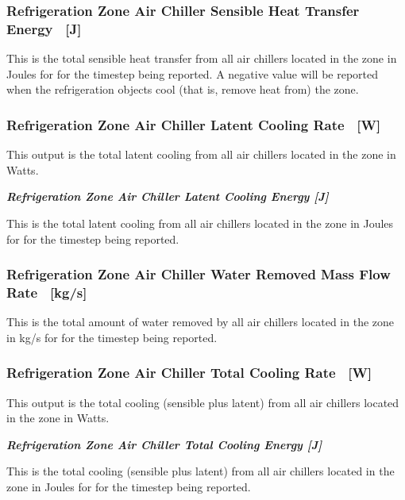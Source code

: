 \subsubsection{Refrigeration Zone Air Chiller Sensible Heat Transfer Energy ~{[}J{]}}\label{refrigeration-zone-air-chiller-sensible-heat-transfer-energy-j}

This is the total sensible heat transfer from all air chillers located in the zone in Joules for for the timestep being reported. A negative value will be reported when the refrigeration objects cool (that is, remove heat from) the zone.

\subsubsection{Refrigeration Zone Air Chiller Latent Cooling Rate ~{[}W{]}}\label{refrigeration-zone-air-chiller-latent-cooling-rate-w}

This output is the total latent cooling from all air chillers located in the zone in Watts.

\textbf{\emph{Refrigeration Zone Air Chiller Latent Cooling Energy {[}J{]}}}

This is the total latent cooling from all air chillers located in the zone in Joules for for the timestep being reported.

\subsubsection{Refrigeration Zone Air Chiller Water Removed Mass Flow Rate~ {[}kg/s{]}}\label{refrigeration-zone-air-chiller-water-removed-mass-flow-rate-kgs}

This is the total amount of water removed by all air chillers located in the zone in kg/s for for the timestep being reported.

\subsubsection{Refrigeration Zone Air Chiller Total Cooling Rate ~{[}W{]}}\label{refrigeration-zone-air-chiller-total-cooling-rate-w}

This output is the total cooling (sensible plus latent) from all air chillers located in the zone in Watts.

\textbf{\emph{Refrigeration Zone Air Chiller Total Cooling Energy {[}J{]}}}

This is the total cooling (sensible plus latent) from all air chillers located in the zone in Joules for for the timestep being reported.

